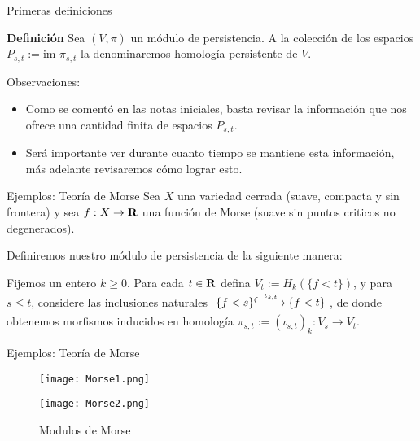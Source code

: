 \documentclass{beamer}
\def\R\re
\def \R{{\bf R}}
\def \re{{\mathbb R}}
\begin{document}
\begin{frame}{Primeras definiciones}

    \begin{block}{\textbf{Definición}}
    Sea $(V,\pi)$ un módulo de persistencia. A la colección de los espacios $P_{s,t}:=\text{im }\pi_{s,t}$ la denominaremos homología persistente de $V$.
    \end{block}
    
    \pause
    
    \begin{block}{Observaciones:}
        \begin{itemize}
            \item Como se comentó en las notas iniciales, basta revisar la información que nos ofrece una cantidad finita de espacios $P_{s,t}$.
            \vfill
            \pause
            
            \item Será importante ver durante cuanto tiempo se mantiene esta información, más adelante revisaremos cómo lograr esto.
            
        \end{itemize}
    \end{block}
    
\end{frame}

\begin{frame}{Ejemplos: Teoría de Morse}
Sea $X$ una variedad cerrada (suave, compacta y sin frontera) y sea $f:X\rightarrow \R$ una función de Morse (suave sin puntos criticos no degenerados). 

Definiremos nuestro módulo de persistencia de la siguiente manera:

Fijemos un entero $k\geq 0$. Para cada $t\in\R$ defina $V_t:=H_k(\{f<t\})$, y para $s\leq t$, considere las inclusiones naturales $\xymatrix{ \{f<s\}\ar@{^(->}[r]^{\iota_{s,t}} &  \{f<t\}}$, de donde obtenemos morfismos inducidos en homología $\pi_{s,t}:=(\iota_{s,t})_k:V_s \rightarrow V_t$.    
\end{frame}

\begin{frame}{Ejemplos: Teoría de Morse}
\begin{figure}
\centering
\begin{minipage}{.5\textwidth}
  \centering
  \texttt{[image: Morse1.png]}
  \caption{Toro (superficie cerrada)}
  \label{fig:sub1}
\end{minipage}%

\begin{minipage}{.5\textwidth}
  \centering
  \texttt{[image: Morse2.png]}
  \caption{Conjuntos de subnivel del Toro}
  \label{fig:sub2}
\end{minipage}
\caption{Modulos de Morse}
\label{fig:test}
\end{figure}
    
\end{frame}
\end{document}
